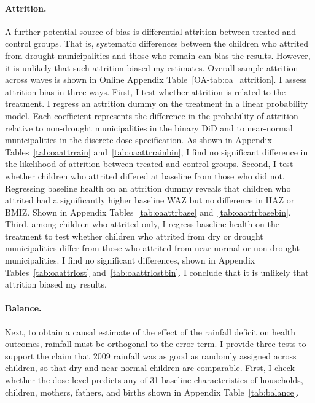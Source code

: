 \documentclass[12pt]{article}
\begin{document}
\paragraph{Attrition.} A further potential source of bias is differential attrition between treated and control groups. That is, systematic differences between the children who attrited from drought municipalities and those who remain can bias the results. However, it is unlikely that such attrition biased my estimates. Overall sample attrition across waves is shown in Online Appendix Table~\ref{OA-tab:oa_attrition}. I assess attrition bias in three ways. First, I test whether attrition is related to the treatment. I regress an attrition dummy on the treatment in a linear probability model. Each coefficient represents the difference in the probability of attrition relative to non-drought municipalities in the binary DiD and to near-normal municipalities in the discrete-dose specification. As shown in Appendix Tables~\ref{tab:oaattrrain} and~\ref{tab:oaattrrainbin}, I find no significant difference in the likelihood of attrition between treated and control groups. Second, I test whether children who attrited differed at baseline from those who did not. Regressing baseline health on an attrition dummy reveals that children who attrited had a significantly higher baseline WAZ but no difference in HAZ or BMIZ. Shown in Appendix Tables~\ref{tab:oaattrbase} and~\ref{tab:oaattrbasebin}. Third, among children who attrited only, I regress baseline health on the treatment to test whether children who attrited from dry or drought municipalities differ from those who attrited from near-normal or non-drought municipalities. I find no significant differences, shown in Appendix Tables~\ref{tab:oaattrlost} and~\ref{tab:oaattrlostbin}. I conclude that it is unlikely that attrition biased my results.

\paragraph{Balance.} Next, to obtain a causal estimate of the effect of the rainfall deficit on health outcomes, rainfall must be orthogonal to the error term. I provide three tests to support the claim that 2009 rainfall was as good as randomly assigned across children, so that dry and near-normal children are comparable. First, I check whether the dose level predicts any of 31 baseline characteristics of households, children, mothers, fathers, and births shown in Appendix Table~\ref{tab:balance}.
\end{document}
